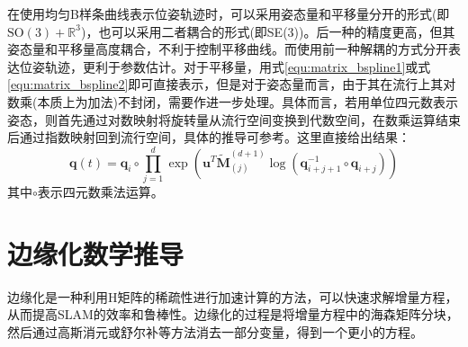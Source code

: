 \documentclass[12pt, onecolumn]{article}
\newcommand\normf{\fangsong}
\begin{document}
	在使用均匀B样条曲线表示位姿轨迹时，可以采用姿态量和平移量分开的形式(即$\mathrm{SO}(3)+\mathbb{R}^3$)，也可以采用二者耦合的形式(即SE(3))。后一种的精度更高，但其姿态量和平移量高度耦合，不利于控制平移曲线。而使用前一种解耦的方式分开表达位姿轨迹，更利于参数估计\cite{haarbach2018survey}。对于平移量，用式\ref{equ:matrix_bspline1}或式\ref{equ:matrix_bspline2}即可直接表示，但是对于姿态量而言，由于其在流行上其对数乘(本质上为加法)不封闭，需要作进一步处理\cite{高翔2017视觉}。具体而言，若用单位四元数表示姿态，则首先通过对数映射将旋转量从流行空间变换到代数空间，在数乘运算结束后通过指数映射回到流行空间，具体的推导可参考\cite{kim1995general}。这里直接给出结果：
	\begin{equation}
	  \boldsymbol{q}(t)=\boldsymbol{q}_i\circ \prod_{j=1}^{d}\exp\left( \boldsymbol{u}^T\tilde{\boldsymbol{M}}^{(d+1)}_{(j)}\log\left( \boldsymbol{q}_{i+j+1}^{-1}\circ \boldsymbol{q}_{i+j}\right) \right)
	\end{equation}
	其中$\circ$表示四元数乘法运算。
	
	
	\section{\normf 边缘化数学推导}
	边缘化是一种利用H矩阵的稀疏性进行加速计算的方法，可以快速求解增量方程，从而提高SLAM的效率和鲁棒性。边缘化的过程是将增量方程中的海森矩阵分块，然后通过高斯消元或舒尔补等方法消去一部分变量，得到一个更小的方程。
	
\end{document}

